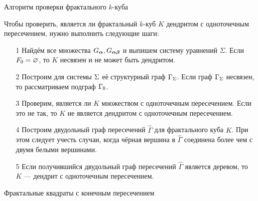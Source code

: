 \documentclass[aspectratio=1610, 10pt, notheorems]{beamer}
\begin{document}
\begin{frame}
\end{frame}


\begin{frame}{Алгоритм проверки фрактального $k$-куба}

Чтобы проверить, является ли фрактальный $k$-куб $K$ дендритом с одноточечным пересечением, нужно выполнить следующие шаги:

\begin{itemize}

\item[1] Найдём все множества $G_{\bm{\alpha}}, G_{{\bm{\alpha}}{\bm{\beta}}}$ и выпишем систему уравнений $\Sigma$.
Если $F_0=\varnothing$, то $K$ несвязен и не может быть дендритом.

\item[2] Построим для системы $\Sigma$ её структурный граф $\Gamma_\Sigma$.
Если граф $\Gamma_\Sigma$ несвязен, то рассматриваем подграф $\Gamma_0$.
 
\item[3] Проверим, является ли $K$ множеством с одноточечным пересечением.
Если это не так, то $K$ не является дендритом с одноточечным пересечением.
    
\item[4] Построим двудольный граф пересечений $\hat\Gamma$ для фрактального куба $K$.
При этом следует учесть случаи, когда чёрная вершина в $\hat\Gamma$ соединена более чем с двумя белыми вершинами.

\item[5] Если получившийся двудольный граф пересечений $\hat\Gamma$ является деревом, то $K$ --- дендрит с одноточечным пересечением.    
\end{itemize}
\end{frame}


\begin{frame}{}
\Huge{Фрактальные квадраты с конечным пересечением}
\end{frame}
\end{document}
